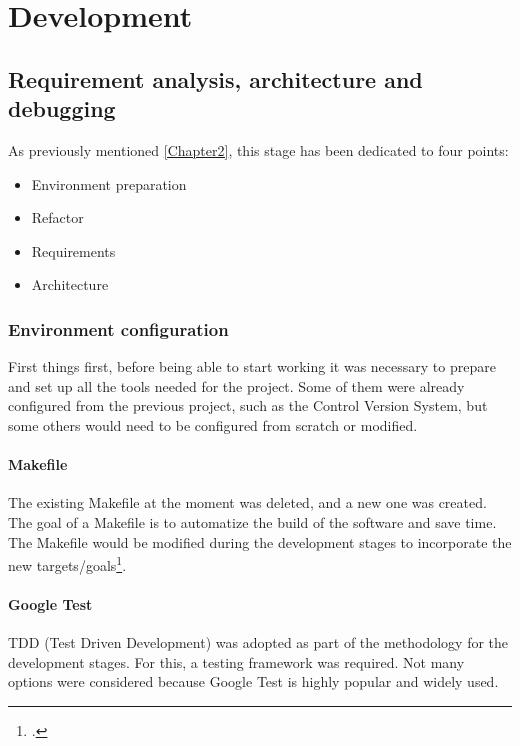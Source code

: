 \chapter{Development} 
\label{Chapter3}

\section{Requirement analysis, architecture and debugging} 
As previously mentioned \ref{Chapter2}, this stage has been dedicated to four points: 
\begin{itemize}
	\item Environment preparation
	\item Refactor
	\item Requirements
	\item Architecture
\end{itemize}

\subsection{Environment configuration}
First things first, before being able to start working it was necessary to prepare and set up all the tools needed for the project. Some of them were already configured from the previous project, such as the Control Version System, but some others would need to be configured from scratch or modified.  


\subsubsection{Makefile}

The existing Makefile at the moment was deleted, and a new one was created. The goal of a Makefile is to automatize the build of the software and save time. The Makefile would be modified during the development stages to incorporate the new targets/goals\footcite{https://en.wikipedia.org/wiki/Makefile}. %



\subsubsection{Google Test}

TDD (Test Driven Development) was adopted as part of the methodology for the development stages. For this, a testing framework was required. Not many options were considered because Google Test is highly popular and widely used.  



